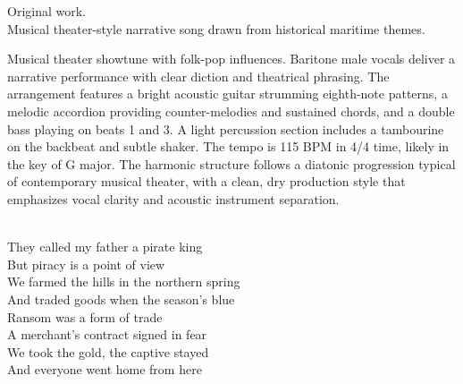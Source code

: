 

\begin{notes}
Original work.\\
Musical theater-style narrative song drawn from historical maritime themes.
\end{notes}

\begin{style}
Musical theater showtune with folk-pop influences. %
Baritone male vocals deliver a narrative performance with clear diction and theatrical phrasing. %
The arrangement features a bright acoustic guitar strumming eighth-note patterns, a melodic accordion providing counter-melodies and sustained chords, and a double bass playing on beats 1 and 3. %
A light percussion section includes a tambourine on the backbeat and subtle shaker. %
The tempo is 115 BPM in 4/4 time, likely in the key of G major. %
The harmonic structure follows a diatonic progression typical of contemporary musical theater, with a clean, dry production style that emphasizes vocal clarity and acoustic instrument separation.
\end{style}

\begin{lyrics}
\\
They called my father a pirate king\\
But piracy is a point of view\\
We farmed the hills in the northern spring\\
And traded goods when the season's blue \\
Ransom was a form of trade\\
A merchant's contract signed in fear\\
We took the gold, the captive stayed\\
And everyone went home from here
\end{lyrics}

